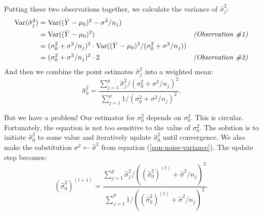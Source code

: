 \documentclass{article}
\begin{document}
    Putting these two observations together, we calculate the variance of $\hat \sigma^2_j$:
    \begin{align*}
      \mbox{Var}(\hat\sigma^2_j)  &= \mbox{Var}((\bar Y - \mu_0)^2 - \sigma^2 / n_j)\\
                                  &= \mbox{Var}((\bar Y - \mu_0)^2) & \mbox{\it (Observation \#1)}\\
                                  &= (\sigma^2_0 + \sigma^2 / n_j)^2 \cdot \mbox{Var}((\bar Y - \mu_0)^2 / (\sigma^2_0 + \sigma^2 / n_j))\\
                                  &= (\sigma^2_0 + \sigma^2 / n_j)^2 \cdot 2 & \mbox{\it (Observation \#2)}
    \end{align*}
    And then we combine the point estimates $\hat\sigma^2_j$ into a weighted mean:
    \begin{equation}
      \label{eqn-population-variance}
      \hat\sigma^2_0 = \frac{\sum_{j = 1}^p \hat\sigma^2_j / (\sigma^2_0 + \sigma^2 / n_j)^2}{\sum_{j = 1}^p 1 / (\sigma^2_0 + \sigma^2 / n_j)^2}.
    \end{equation}

    But we have a problem! Our estimator for $\sigma^2_0$ depends on $\sigma^2_0$. This is circular. Fortunately, the equation is not too sensitive to the value of $\sigma^2_0$. The solution is to initiate $\hat\sigma^2_0$ to some value and iteratively update $\hat\sigma^2_0$ until convergence. We also make the substitution $\sigma^2 \leftarrow \hat\sigma^2$ from equation (\ref{eqn-noise-variance}). The update step becomes:
    \begin{equation}
      \label{eqn-population-variance-update}
      (\hat\sigma^2_0)^{(t + 1)} = \frac{\sum_{j = 1}^p \hat\sigma^2_j / \left((\hat\sigma^2_0)^{(t)} + \hat\sigma^2 / n_j\right)^2}{\hat\sum_{j = 1}^p 1 / \left((\hat\sigma^2_0)^{(t)} + \hat\sigma^2 / n_j\right)^2}.
    \end{equation}
\end{document}
